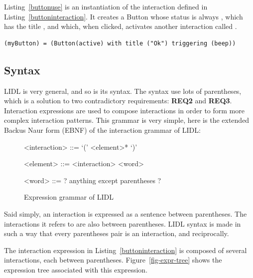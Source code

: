 Listing~\ref{buttonuse} is an instantiation of the interaction defined in Listing~\ref{buttoninteraction}. It creates a Button whose status is always , which has the title , and which, when clicked, activates another interaction called . 

\begin{lstlisting}[caption=Usage of a button,label=buttonuse]
(myButton) = (Button(active) with title ("Ok") triggering (beep))
\end{lstlisting}








\subsection{Syntax}

LIDL is very general, and so is its syntax. The syntax use lots of parentheses, which is a solution to two contradictory requirements: \textbf{REQ2} and \textbf{REQ3}. Interaction expressions are used to compose interactions in order to form more complex interaction patterns. This grammar is very simple, here is the extended Backus Naur form (EBNF) of the interaction grammar of LIDL:

\begin{figure}
\begin{grammar}
<interaction> ::= `(' <element>* `)'

<element> ::= <interaction>
 \alt <word>
 
<word> ::= ? anything except parentheses ?
	
\end{grammar}
\caption{Expression grammar of LIDL}
\label{fig-expr-grammar}
\end{figure}



Said simply, an interaction is expressed as a sentence between parentheses. The interactions it refers to are also between parentheses. LIDL syntax is made in such a way that every parentheses pair  is an interaction, and reciprocally. 

The interaction expression in Listing~\ref{buttoninteraction} is composed of several interactions, each between parentheses. Figure~\ref{fig-expr-tree} shows the expression tree associated with this expression.


